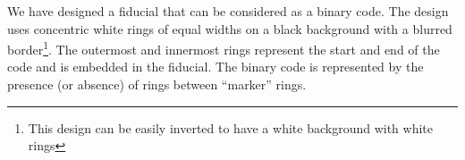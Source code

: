 \documentclass[runningheads]{llncs}
\begin{document}

We have designed a fiducial that can be considered as a binary code.  The design
uses concentric white rings of equal widths on a black background with a
blurred border\footnote{This design can be easily inverted to have a white
background with white rings}. The outermost and innermost rings represent the
start and end of the code and is embedded in the fiducial.  The binary code is
represented by the presence (or absence) of rings between ``marker'' rings.
\end{document}
